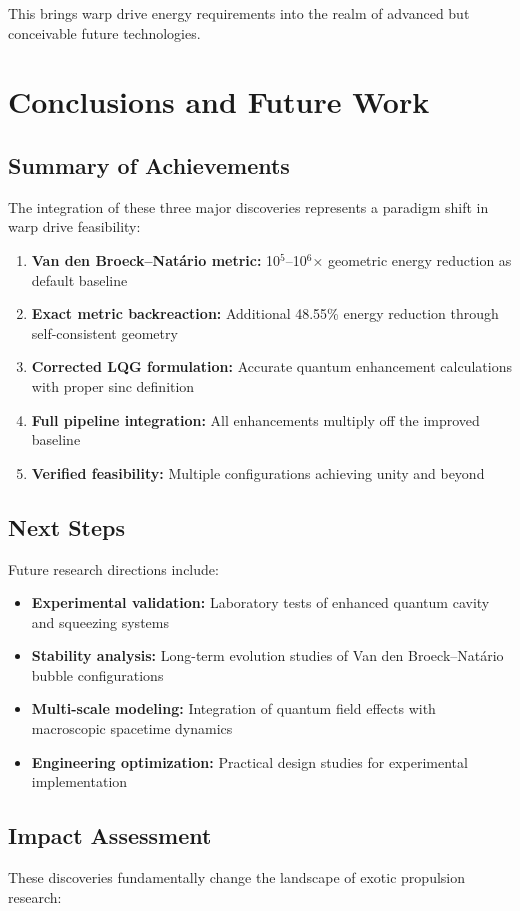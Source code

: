 \documentclass[11pt]{article}
\begin{document}
This brings warp drive energy requirements into the realm of advanced but conceivable future technologies.

\section{Conclusions and Future Work}

\subsection{Summary of Achievements}
The integration of these three major discoveries represents a paradigm shift in warp drive feasibility:

\begin{enumerate}
\item \textbf{Van den Broeck–Natário metric:} 10$^5$–10$^6$× geometric energy reduction as default baseline
\item \textbf{Exact metric backreaction:} Additional 48.55\% energy reduction through self-consistent geometry
\item \textbf{Corrected LQG formulation:} Accurate quantum enhancement calculations with proper sinc definition
\item \textbf{Full pipeline integration:} All enhancements multiply off the improved baseline
\item \textbf{Verified feasibility:} Multiple configurations achieving unity and beyond
\end{enumerate}

\subsection{Next Steps}
Future research directions include:

\begin{itemize}
\item \textbf{Experimental validation:} Laboratory tests of enhanced quantum cavity and squeezing systems
\item \textbf{Stability analysis:} Long-term evolution studies of Van den Broeck–Natário bubble configurations
\item \textbf{Multi-scale modeling:} Integration of quantum field effects with macroscopic spacetime dynamics
\item \textbf{Engineering optimization:} Practical design studies for experimental implementation
\end{itemize}

\subsection{Impact Assessment}
These discoveries fundamentally change the landscape of exotic propulsion research:
\end{document}
